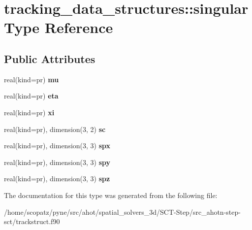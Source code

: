 \hypertarget{structtracking__data__structures_1_1singular}{\section{tracking\-\_\-data\-\_\-structures\-:\-:singular Type Reference}
\label{structtracking__data__structures_1_1singular}
}
\subsection*{Public Attributes}
\begin{DoxyCompactItemize}
\item 
\hypertarget{structtracking__data__structures_1_1singular_acd79fe7d9374778a1a073f01d33bc323}{real(kind=pr) {\bfseries mu}}\label{structtracking__data__structures_1_1singular_acd79fe7d9374778a1a073f01d33bc323}

\item 
\hypertarget{structtracking__data__structures_1_1singular_a8015e49ee70edd759eb801446b40de59}{real(kind=pr) {\bfseries eta}}\label{structtracking__data__structures_1_1singular_a8015e49ee70edd759eb801446b40de59}

\item 
\hypertarget{structtracking__data__structures_1_1singular_ac42e62b9f85705c6e68a6d07bc6c889c}{real(kind=pr) {\bfseries xi}}\label{structtracking__data__structures_1_1singular_ac42e62b9f85705c6e68a6d07bc6c889c}

\item 
\hypertarget{structtracking__data__structures_1_1singular_ae99e040b2944a8f103cb730cef072f7b}{real(kind=pr), dimension(3, 2) {\bfseries sc}}\label{structtracking__data__structures_1_1singular_ae99e040b2944a8f103cb730cef072f7b}

\item 
\hypertarget{structtracking__data__structures_1_1singular_aeb81711c1d7153fe3dc8eae682f08134}{real(kind=pr), dimension(3, 3) {\bfseries spx}}\label{structtracking__data__structures_1_1singular_aeb81711c1d7153fe3dc8eae682f08134}

\item 
\hypertarget{structtracking__data__structures_1_1singular_ab7f1cf71b301b3dd7b30004bb3fecbea}{real(kind=pr), dimension(3, 3) {\bfseries spy}}\label{structtracking__data__structures_1_1singular_ab7f1cf71b301b3dd7b30004bb3fecbea}

\item 
\hypertarget{structtracking__data__structures_1_1singular_a5bfe4d508ca8ba24ddd3c14c20c03086}{real(kind=pr), dimension(3, 3) {\bfseries spz}}\label{structtracking__data__structures_1_1singular_a5bfe4d508ca8ba24ddd3c14c20c03086}

\end{DoxyCompactItemize}


The documentation for this type was generated from the following file\-:\begin{DoxyCompactItemize}
\item 
/home/scopatz/pyne/src/ahot/spatial\-\_\-solvers\-\_\-3d/\-S\-C\-T-\/\-Step/src\-\_\-ahotn-\/step-\/sct/trackstruct.\-f90\end{DoxyCompactItemize}
